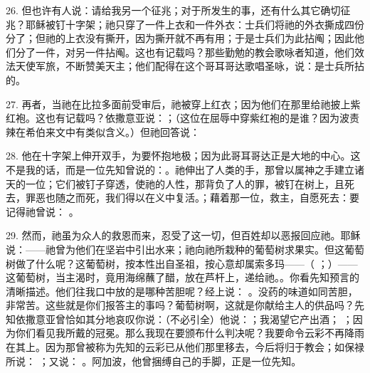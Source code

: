 26. 但也许有人说：请给我另一个征兆；对于所发生的事，还有什么其它确切征兆？耶稣被钉十字架；祂只穿了一件上衣和一件外衣：士兵们将祂的外衣撕成四份分了；但祂的上衣没有撕开，因为撕开就不再有用；于是士兵们为此拈阄；因此他们分了一件，对另一件拈阄。这也有记载吗？那些勤勉的教会歌咏者知道，他们效法天使军旅，不断赞美天主；他们配得在这个哥耳哥达歌唱圣咏，说：是士兵所拈的。\par

27. 再者，当祂在比拉多面前受审后，祂被穿上红衣；因为他们在那里给祂披上紫红袍。这也有记载吗？依撒意亚说：；（这位在屈辱中穿紫红袍的是谁？因为波责辣在希伯来文中有类似含义。）但祂回答说：\par

28. 他在十字架上伸开双手，为要怀抱地极；因为此哥耳哥达正是大地的中心。这不是我的话，而是一位先知曾说的：。祂伸出了人类的手，那曾以属神之手建立诸天的一位；它们被钉子穿透，使祂的人性，那背负了人的罪，被钉在树上，且死去，罪恶也随之而死，我们得以在义中复活。；藉着那一位，救主，自愿死去：要记得祂曾说： 。\par

29. 然而，祂虽为众人的救恩而来，忍受了这一切，但百姓却以恶报回应祂。耶稣说：——祂曾为他们在坚岩中引出水来；祂向祂所栽种的葡萄树求果实。但这葡萄树做了什么呢？这葡萄树，按本性出自圣祖，按心意却属索多玛——（ ；）——这葡萄树，当主渴时，竟用海绵蘸了醋，放在芦杆上，递给祂。。你看先知预言的清晰描述。他们往我口中放的是哪种苦胆呢？经上说： 。没药的味道如同苦胆，非常苦。这些就是你们报答主的事吗？葡萄树啊，这就是你献给主人的供品吗？先知依撒意亚曾恰如其分地哀叹你说：（不必引全）他说：；我渴望它产出酒； ；因为你们看见我所戴的冠冕。那么我现在要颁布什么判决呢？我要命令云彩不再降雨在其上。因为那曾被称为先知的云彩已从他们那里移去，今后将归于教会；如保禄所说： ；又说： 。阿加波，他曾捆缚自己的手脚，正是一位先知。\par

